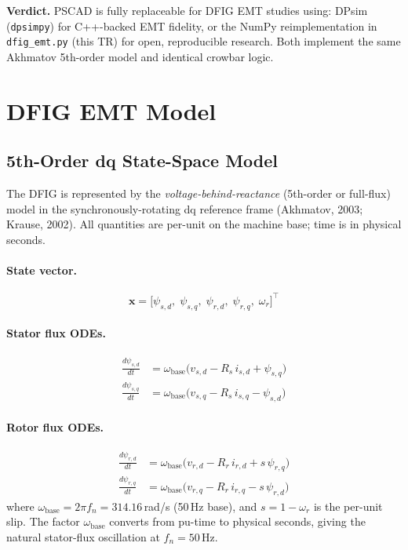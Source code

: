 \documentclass[11pt,a4paper]{article}
\begin{document}
\begin{mdframed}
\textbf{Verdict.}  PSCAD is fully replaceable for DFIG EMT studies using:
DPsim (\texttt{dpsimpy}) for C++-backed EMT fidelity, or the NumPy
reimplementation in \texttt{dfig\_emt.py} (this TR) for open, reproducible
research.  Both implement the same Akhmatov 5th-order model and identical
crowbar logic.
\end{mdframed}

\section{DFIG EMT Model}

\subsection{5th-Order dq State-Space Model}

The DFIG is represented by the \emph{voltage-behind-reactance}
(5th-order or full-flux) model in the synchronously-rotating
dq reference frame (Akhmatov, 2003; Krause, 2002).  All quantities
are per-unit on the machine base; time is in physical seconds.

\paragraph{State vector.}
\begin{equation}
  \mathbf{x} = \bigl[\psi_{s,d},\;\psi_{s,q},\;\psi_{r,d},\;\psi_{r,q},\;
                \omega_r\bigr]^\top
  \label{eq:statevec}
\end{equation}

\paragraph{Stator flux ODEs.}
\begin{align}
  \frac{d\psi_{s,d}}{dt} &= \omega_\text{base}\bigl(
    v_{s,d} - R_s\,i_{s,d} + \psi_{s,q}\bigr)
  \label{eq:psd}\\
  \frac{d\psi_{s,q}}{dt} &= \omega_\text{base}\bigl(
    v_{s,q} - R_s\,i_{s,q} - \psi_{s,d}\bigr)
  \label{eq:psq}
\end{align}

\paragraph{Rotor flux ODEs.}
\begin{align}
  \frac{d\psi_{r,d}}{dt} &= \omega_\text{base}\bigl(
    v_{r,d} - R_r\,i_{r,d} + s\,\psi_{r,q}\bigr)
  \label{eq:prd}\\
  \frac{d\psi_{r,q}}{dt} &= \omega_\text{base}\bigl(
    v_{r,q} - R_r\,i_{r,q} - s\,\psi_{r,d}\bigr)
  \label{eq:prq}
\end{align}
where $\omega_\text{base} = 2\pi f_n = 314.16$\,rad/s (50\,Hz base),
and $s = 1 - \omega_r$ is the per-unit slip.
The factor $\omega_\text{base}$ converts from pu-time to physical seconds,
giving the natural stator-flux oscillation at $f_n = 50$\,Hz.
\end{document}
